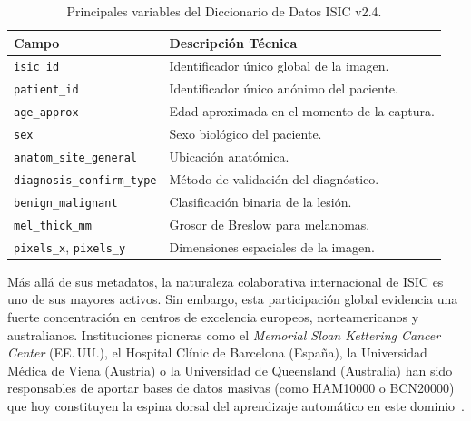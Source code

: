 \begin{table}[htbp]
\centering
\small
\caption{Principales variables del Diccionario de Datos ISIC v2.4.}\label{tab:isic-metadata}
\begin{tabular}{p{5.5cm}p{9.5cm}}
\toprule
\textbf{Campo} & \textbf{Descripción Técnica}\\
\midrule
\texttt{isic\_id} & Identificador único global de la imagen.\\
\texttt{patient\_id} & Identificador único anónimo del paciente.\\
\texttt{age\_approx} & Edad aproximada en el momento de la captura.\\
\texttt{sex} & Sexo biológico del paciente.\\
\texttt{anatom\_site\_general} & Ubicación anatómica.\\
\texttt{diagnosis\_confirm\_type} & Método de validación del diagnóstico.\\
\texttt{benign\_malignant} & Clasificación binaria de la lesión.\\
\texttt{mel\_thick\_mm} & Grosor de Breslow para melanomas.\\
\texttt{pixels\_x}, \texttt{pixels\_y} & Dimensiones espaciales de la imagen.\\
\bottomrule
\end{tabular}
\end{table}


Más allá de sus metadatos, la naturaleza colaborativa internacional de ISIC es uno de sus mayores activos. 
Sin embargo, esta participación global evidencia una fuerte concentración en centros de excelencia europeos, 
norteamericanos y australianos. Instituciones pioneras como el \textit{Memorial Sloan Kettering Cancer Center} 
(EE.\,UU.), el Hospital Clínic de Barcelona (España), la Universidad Médica de Viena (Austria) o la 
Universidad de Queensland (Australia) han sido responsables de aportar bases de datos masivas (como HAM10000 
o BCN20000) que hoy constituyen la espina dorsal del aprendizaje automático en este 
dominio~\cite{iccs_bias_derm}.

